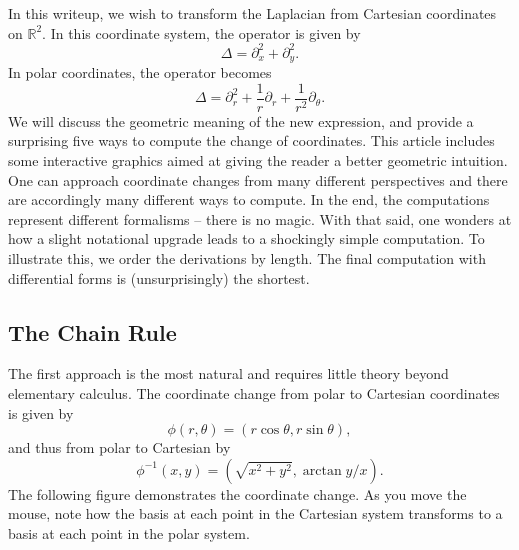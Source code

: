 \documentclass[12pt,letterpaper,boxed]{jhwhw}
\newcommand{\lrparen}[1]{{\left( #1 \right)}}
\newcommand{\R}{{\mathbb{R}}}
\begin{document}
In this writeup, we wish to transform the Laplacian from Cartesian coordinates on $\R^2$. In this coordinate system, the operator is given by
\[
	\Delta = \partial_x^2 + \partial_y^2.
\]
In polar coordinates, the operator becomes
\[
	\Delta = \partial_r^2 + \frac{1}{r} \partial_r + \frac{1}{r^2} \partial_\theta.
\]
We will discuss the geometric meaning of the new expression, and provide a surprising  five ways to compute the change of coordinates. This article includes some interactive graphics aimed at giving the reader a better geometric intuition. One can approach coordinate changes from many different perspectives and there are accordingly many different ways to compute. In the end, the computations represent different formalisms -- there is no magic. With that said, one wonders at how a slight notational upgrade leads to a shockingly simple computation. To illustrate this, we order the derivations by length. The final computation with differential forms is (unsurprisingly) the shortest.

\subsection{The Chain Rule}
The first approach is the most natural and requires little theory beyond elementary calculus. The coordinate change from polar to Cartesian coordinates is given by
\[
	\phi(r, \theta) = (r \cos \theta, r \sin \theta),
\]
and thus from polar to Cartesian by
\[
	\phi^{-1}(x, y) = \lrparen{\sqrt{x^2 + y^2}, \arctan y/x}.
\]
The following figure demonstrates the coordinate change. As you move the mouse, note how the basis at each point in the Cartesian system transforms to a basis at each point in the polar system.
\end{document}
